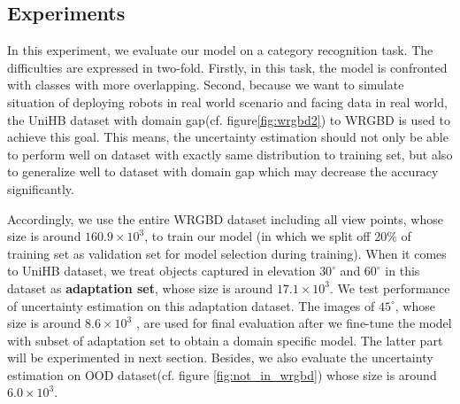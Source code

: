 \newpage
\subsection{Experiments }
In this experiment, we evaluate our model on a category recognition task. The difficulties are expressed in two-fold. Firstly, in this task, the model is confronted with classes with more overlapping. Second, because we want to simulate situation of deploying robots in real world scenario and facing data in real world, the UniHB dataset with domain gap(cf. figure\ref{fig:wrgbd2}) to WRGBD is used to achieve this goal. This means, the uncertainty estimation should not only be able to perform well on dataset with exactly same distribution to training set, but also to generalize well to dataset with domain gap which may decrease the accuracy significantly.

Accordingly, we use the entire WRGBD dataset including all view points, whose size is around $160.9\times10^3$, to train our model (in which we split off 20\% of training set as validation set for model selection during training). When it comes to UniHB dataset, we treat objects captured in elevation $30^\circ$ and $60^\circ$ in this dataset as \textbf{adaptation set}, whose size is around $17.1\times10^3$. We test performance of uncertainty estimation on this adaptation dataset. The images of $45^\circ$, whose size is around $8.6\times10^3$ , are used for final evaluation after we fine-tune the model with subset of adaptation set to obtain a domain specific model. The latter part will be experimented in next section. Besides, we also evaluate the uncertainty estimation on OOD dataset(cf. figure \ref{fig:not_in_wrgbd}) whose size is around $6.0\times10^3$. 


